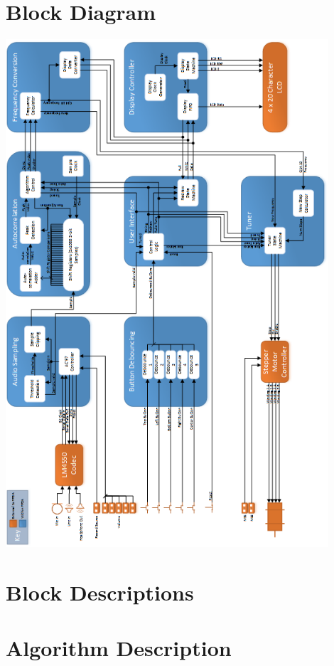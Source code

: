 \documentclass[aps,letterpaper,10pt]{revtex4}
\begin{document}
\section{Block Diagram}
\includegraphics[width=0.9\textwidth]{guitar_tuner_block_diagram.png}

\section{Block Descriptions}

\section{Algorithm Description}
\end{document}
